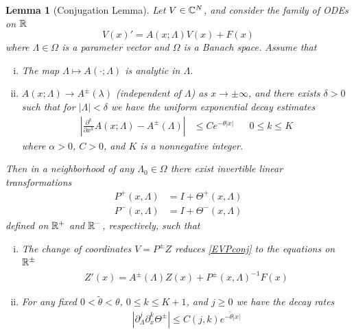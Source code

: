 \documentclass[10pt,reqno]{amsart}
\theoremstyle{plain}
\newtheorem{lemma}[theorem]{Lemma}
\theoremstyle{definition}
\theoremstyle{remark}
\numberwithin{theorem}{section}
\numberwithin{equation}{section}
\begin{document}
\begin{lemma}[Conjugation Lemma]\label{conjlemma}
Let $V \in \mathbb{C}^N$, and consider the family of ODEs on $\mathbb{R}$
\begin{equation}\label{EVPconj}
V(x)' = A(x; \Lambda) V(x) + F(x)
\end{equation}
where $\Lambda \in \Omega$ is a parameter vector and $\Omega$ is a Banach space. Assume that
\begin{enumerate}[(i)]
	\item The map $\Lambda \mapsto A(\cdot; \Lambda)$ is analytic in $\Lambda$.
	\item $A(x; \Lambda) \rightarrow A^\pm(\lambda)$ (independent of $\Lambda$) as $x \rightarrow \pm \infty$, and there exists $\delta > 0$ such that for $|\Lambda| < \delta$ we have the uniform exponential decay estimates 
	\begin{align}
	\left| \frac{\partial^k}{\partial x^k} A(x; \Lambda) - A^\pm(\Lambda) \right| 
	&\leq C e^{-\theta |x|} && 0 \leq k \leq K
	\end{align}
	where $\alpha > 0$, $C > 0$, and $K$ is a nonnegative integer.
\end{enumerate}
Then in a neighborhood of any $\Lambda_0 \in \Omega$ there exist invertible linear transformations
\begin{equation}\label{conjlemmaP}
\begin{aligned}
P^+(x, \Lambda) &= I + \Theta^+(x, \Lambda) \\
P^-(x, \Lambda) &= I + \Theta^-(x, \Lambda) 
\end{aligned}
\end{equation}
defined on $\mathbb{R}^+$ and $\mathbb{R}^-$, respectively, such that
\begin{enumerate}[(i)]
\item The change of coordinates $V = P^\pm Z$ reduces \eqref{EVPconj} to the equations on $\mathbb{R}^\pm$
\begin{align}\label{conjZ}
Z'(x) = A^\pm(\Lambda) Z(x) + P^\pm(x, \Lambda)^{-1} F(x)
\end{align}

\item For any fixed $0 < \tilde{\theta} < \theta$, $0 \leq k \leq K+1$, and $j \geq 0$ we have the decay rates
\begin{align}\label{conjthetadecay}
\left| \partial_\Lambda^j \partial_x^k \Theta^\pm \right| \leq C(j, k)e^{-\tilde{\theta}|x|}
\end{align}
\end{enumerate}
\end{lemma}
\end{document}
